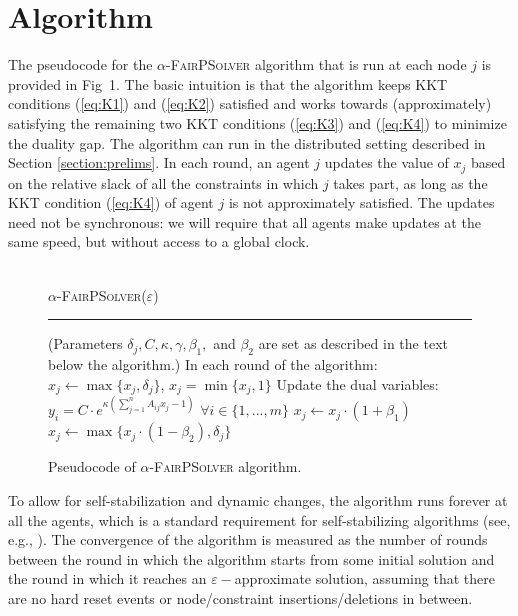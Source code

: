 \documentclass[11pt]{article}
\begin{document}
\section{Algorithm}\label{section:algorithm}

The pseudocode for the \textsc{$\alpha$-FairPSolver} algorithm that is run at each node $j$ is provided in Fig~1. 
The basic intuition is that the algorithm keeps KKT conditions (\ref{eq:K1}) and (\ref{eq:K2}) satisfied and works towards (approximately) satisfying the remaining two KKT conditions (\ref{eq:K3}) and (\ref{eq:K4}) to minimize the duality gap. 
The algorithm can run in the distributed setting described in Section \ref{section:prelims}. In each round, an agent $j$ updates the value of $x_j$ based on the relative slack of all the constraints in which $j$ takes part, as long as the KKT condition (\ref{eq:K4}) of agent $j$ is not approximately satisfied. 
The updates need not be synchronous: we will require that all agents make updates at the same speed, but without access to a global clock.
\begin{figure}[!ht]
\small{
\hrulefill\\
\textsc{$\alpha$-FairPSolver}($\varepsilon$)\\[-8pt]
\hrule
\begin{algorithmic}[1]
\vspace{2pt}\Statex (Parameters $\delta_j, C, \kappa, \gamma, \beta_1,$ and $\beta_2$ are set as described in the text below the algorithm.)
\Statex In each round of the algorithm:
\State $x_j \leftarrow \max\{x_j, \delta_j\}$, $x_j = \min\{x_j, 1\}$
\State Update the dual variables: $y_i = C\cdot e^{\kappa \left(\sum_{j=1}^n A_{ij}x_j - 1 \right)}$ $\forall i\in\{1,...,m\}$
\State $x_j \leftarrow x_j \cdot(1+\beta_1)$
\Else{}
\State $x_j \leftarrow \max\{x_j\cdot(1-\beta_2), \delta_j\}$
\EndIf\EndIf
\end{algorithmic}}\vspace{-10pt}
\hrulefill
\caption{Pseudocode of \textsc{$\alpha$-FairPSolver} algorithm.}\vspace{-10pt}
\end{figure}

To allow for self-stabilization and dynamic changes, the algorithm runs forever at all the agents, which is a standard requirement for self-stabilizing algorithms (see, e.g., \cite{dolev2000self}). The convergence of the algorithm is measured as the number of rounds between the round in which the algorithm starts from some initial solution and the round in which it reaches an $\varepsilon-$approximate solution, assuming that there are no hard reset events or node/constraint insertions/deletions in between. 
\end{document}
